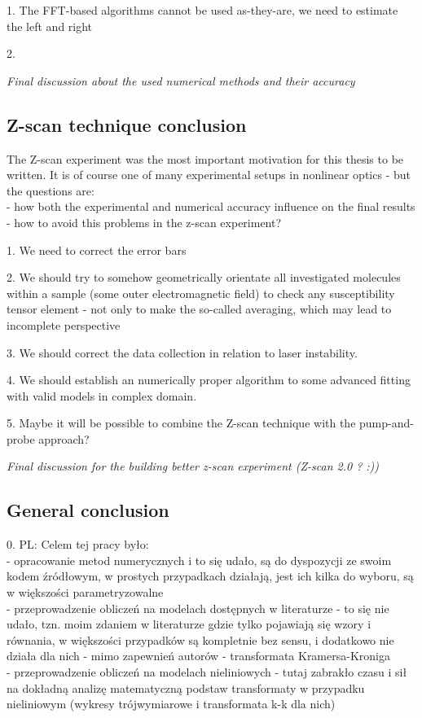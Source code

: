 \documentclass[12pt,twoside,a4paper]{article}
\def\emptyline{\vspace{12pt}}
\numberwithin{equation}{subsection}
\numberwithin{figure}{subsection}
\begin{document}
\emptyline

1. The FFT-based algorithms cannot be used as-they-are, we need to
estimate the left and right


\emptyline

2. 


\textit{Final discussion about the used numerical methods and their accuracy}

\subsection{Z-scan technique conclusion} \label{chap:conclusion_zscan}

The Z-scan experiment was the most important motivation for this thesis to be written. It is of course one of many experimental
setups in nonlinear optics - but the questions are: \\
- how both the experimental and numerical accuracy influence on the final results \\
- how to avoid this problems in the z-scan experiment? \\
\emptyline

1. We need to correct the error bars

2. We should try to somehow geometrically orientate all investigated molecules within a sample (some outer electromagnetic field)
to check any susceptibility tensor element - not only to make the so-called averaging, which may lead to incomplete perspective

3. We should correct the data collection in relation to laser instability.

4. We should establish an numerically proper algorithm to some advanced fitting with valid models in complex domain.

5. Maybe it will be possible to combine the Z-scan technique with the pump-and-probe approach?

\textit{Final discussion for the building better z-scan experiment (Z-scan 2.0 ? :))}

\subsection{General conclusion} \label{chap:conclusion_general}

0. PL: Celem tej pracy było:\\
- opracowanie metod numerycznych i to się udało, są do dyspozycji ze swoim kodem źródłowym, w prostych przypadkach działają, jest
ich kilka do wyboru, są w większości parametryzowalne \\ 
- przeprowadzenie obliczeń na modelach dostępnych w literaturze - to się nie udało, tzn. moim zdaniem w
literaturze gdzie tylko pojawiają się wzory i równania, w większości przypadków są kompletnie bez sensu, i dodatkowo nie działa dla
nich - mimo zapewnień autorów - transformata Kramersa-Kroniga \\
- przeprowadzenie obliczeń na modelach nieliniowych - tutaj zabrakło czasu i sił na dokładną analizę matematyczną podstaw
transformaty w przypadku nieliniowym (wykresy trójwymiarowe i transformata k-k dla nich)\\
\end{document}
